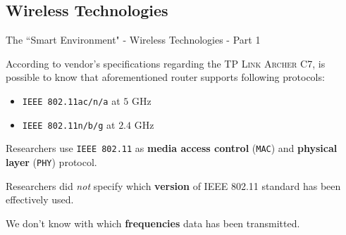 \documentclass[10pt]{beamer}
\begin{document}
\subsection{Wireless Technologies}
\begin{frame}{The ``Smart Environment" - Wireless Technologies - Part 1}

According to vendor's specifications regarding the \textsc{TP Link Archer C7}, is possible to know that aforementioned router supports following protocols:

\begin{itemize}
\item \texttt{IEEE 802.11ac/n/a} at $5$ GHz
\item \texttt{IEEE 802.11n/b/g} at $2.4$ GHz
\end{itemize}

\begin{block}{}
Researchers use \texttt{IEEE 802.11} as \textbf{media access control} (\texttt{MAC}) and \textbf{physical layer} (\texttt{PHY}) protocol.
\end{block}

\begin{block}{}
Researchers did \textit{not} specify which \textbf{version} of IEEE 802.11 standard has been effectively used. 

We don't know with which \textbf{frequencies} data has been transmitted.
\end{block}

\end{frame} 
\end{document}
